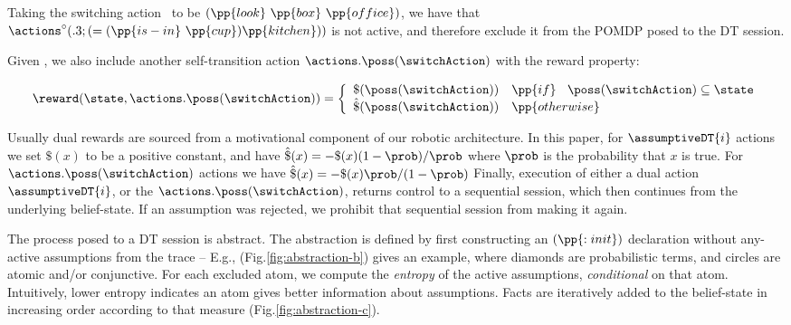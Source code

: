 \noindent Taking the switching action \switchAction\ to be
$(\pp{look}~\pp{box}~\pp{office})$, we have that
$\actions^{\circ}(.3;(=(\pp{is-in}~\pp{cup})\pp{kitchen}))$ is not
active, and therefore exclude it from the
POMDP posed to the DT session. 

Given \switchAction, we also include another self-transition action
$\actions.\poss(\switchAction)$ with the reward property:

\[
\reward(\state, \actions.\poss(\switchAction)) = \bigg\{ \begin{array}{ll}
\$(\poss(\switchAction)) & \pp{if}~\;\; \poss(\switchAction) \subseteq \state \\
\hat\$(\poss(\switchAction)) & \pp{otherwise} \\
\end{array}
\]


\noindent Usually dual rewards are sourced
from a motivational component of our robotic architecture. In this
paper, for $\assumptiveDT{i}$ actions we set $\$(x)$ to be a positive
constant, and have $\hat\$(x)= - \$(x)(1 - \prob) / \prob$ where
$\prob$ is the probability that $x$ is true. For
$\actions.\poss(\switchAction)$ actions we have $\hat\$(x)= -
\$(x)\prob/(1-\prob)$
Finally, execution of either a dual action $\assumptiveDT{i}$, or the
$\actions.\poss(\switchAction)$, returns control to a sequential
session, which then continues from the underlying belief-state. If an
assumption was rejected, we prohibit that sequential session from
making it again.



The process posed to a DT session is abstract. The abstraction is
defined by first constructing an $(\pp{:init})$ declaration without
any-active assumptions from the trace -- E.g.,
(Fig.\ref{fig:abstraction-b}) gives an example, where diamonds are
probabilistic terms, and circles are atomic and/or conjunctive.
For each excluded atom, we compute the {\em entropy} of the active
assumptions, {\em conditional} on that atom. Intuitively, lower
entropy indicates an atom gives better information about
assumptions. Facts are iteratively added to the belief-state in
increasing order according to that measure
(Fig.\ref{fig:abstraction-c}).







